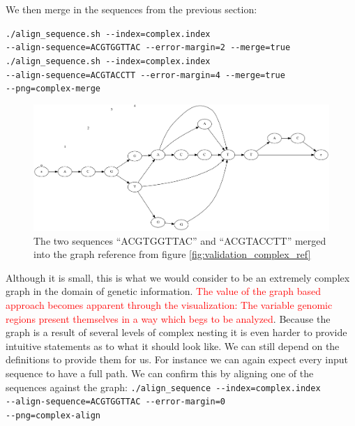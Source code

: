 \documentclass[thesis.tex]{subfiles}
\begin{document}
\noindent
We then merge in the sequences from the previous section:\\
\par\noindent
\texttt{./align\_sequence.sh -{}-index=complex.index \\
-{}-align-sequence=ACGTGGTTAC -{}-error-margin=2 -{}-merge=true}\\
\texttt{./align\_sequence.sh -{}-index=complex.index \\
-{}-align-sequence=ACGTACCTT -{}-error-margin=4 -{}-merge=true \\
-{}-png=complex-merge}\\
\begin{figure}[H]
  \begin{mdframed}
    \includegraphics[width=\textwidth]{output/complex-merge.png}
  \end{mdframed}
  \caption[The result of merging several sequences into \ref{fig:validation_complex_ref}]{The two sequences ``ACGTGGTTAC'' and ``ACGTACCTT'' merged into the graph reference from figure \ref{fig:validation_complex_ref}}
  \label{fig:complex_2}
\end{figure}
\noindent
Although it is small, this is what we would consider to be an extremely complex graph in the domain of genetic information.\textcolor{red}{ The value of the graph based approach becomes apparent through the visualization: The variable genomic regions present themselves in a way which begs to be analyzed}. Because the graph is a result of several levels of complex nesting it is even harder to provide intuitive statements as to what it should look like. We can still depend on the definitions to provide them for us. For instance we can again expect every input sequence to have a full path. We can confirm this by aligning one of the sequences against the graph:
\clearpage\noindent
\texttt{./align\_sequence -{}-index=complex.index \\
  -{}-align-sequence=ACGTGGTTAC -{}-error-margin=0 \\
  -{}-png=complex-align}
\end{document}
